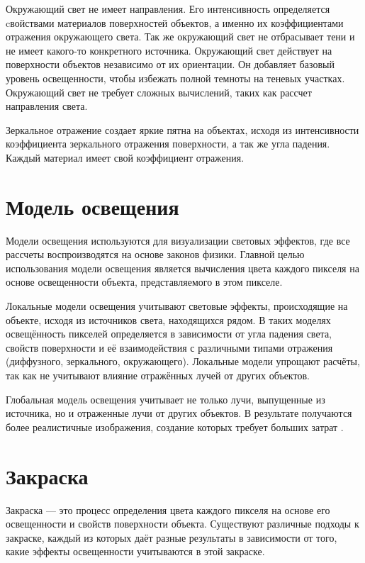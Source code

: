 Окружающий свет не имеет направления. Его интенсивность определяется cвойствами материалов поверхностей объектов, а именно их коэффициентами отражения окружающего света.
Так же окружающий свет не отбрасывает тени и не имеет какого-то конкретного источника.
Окружающий свет действует на поверхности объектов независимо от их ориентации. Он добавляет базовый уровень освещенности, чтобы избежать полной темноты на теневых участках. Окружающий свет не требует сложных вычислений, таких как рассчет направления света.
 
Зеркальное отражение создает яркие пятна на объектах, исходя из интенсивности коэффициента зеркального отражения поверхности, а так же угла падения.
Каждый материал имеет свой коэффициент отражения.

\section{Модель освещения}
Модели освещения используются для визуализации световых эффектов, где все рассчеты воспроизводятся на основе законов физики. Главной целью использования модели освещения является вычисления цвета каждого пикселя на основе освещенности объекта, представляемого в этом пикселе.

Локальные модели освещения учитывают световые эффекты, происходящие на объекте, исходя из источников света, находящихся рядом. В таких моделях освещённость пикселей определяется в зависимости от угла падения света, свойств поверхности и её взаимодействия с различными типами отражения (диффузного, зеркального, окружающего). Локальные модели упрощают расчёты, так как не учитывают влияние отражённых лучей от других объектов. %


Глобальная модель освещения учитывает не только лучи, выпущенные из источника, но и отраженные лучи от других объектов. В результате получаются более реалистичные изображения, создание которых требует больших затрат \cite{pharr}. %


\section{Закраска} Закраска --- это процесс определения цвета каждого пикселя на основе его освещенности и свойств поверхности объекта. Существуют различные подходы к закраске, каждый из которых даёт разные результаты в зависимости от того, какие эффекты освещенности учитываются в этой закраске.

